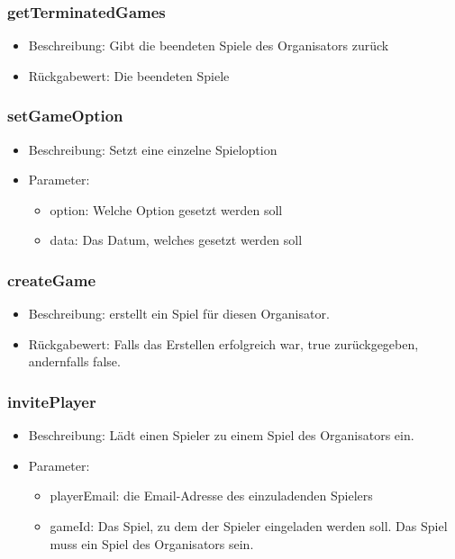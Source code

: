 \documentclass[a4paper]{scrreprt}
\begin{document}
	\subsubsection{getTerminatedGames}
	\begin{itemize}
		\item Beschreibung: Gibt die beendeten Spiele des Organisators zurück
		\item Rückgabewert: Die beendeten Spiele
		\end{itemize}
	\subsubsection{setGameOption}
	\begin{itemize}
		\item Beschreibung: Setzt eine einzelne Spieloption
		\item Parameter:
		\begin{itemize}
		\item option: Welche Option gesetzt werden soll
		\item data: Das Datum, welches gesetzt werden soll
		\end{itemize}
		\end{itemize}
	\subsubsection{createGame}
	\begin{itemize}
		\item Beschreibung: erstellt ein Spiel für diesen Organisator.
		\item Rückgabewert: Falls das Erstellen erfolgreich war, true zurückgegeben, andernfalls false.
	\end{itemize}
	\subsubsection{invitePlayer}
	\begin{itemize}
		\item Beschreibung: Lädt einen Spieler zu einem Spiel des Organisators ein.
		\item Parameter:
		\begin{itemize}
			\item playerEmail: die Email-Adresse des einzuladenden Spielers
			\item gameId: Das Spiel, zu dem der Spieler eingeladen werden soll. Das Spiel muss ein Spiel des Organisators sein.
		\end{itemize}
	\end{itemize}
\end{document}
